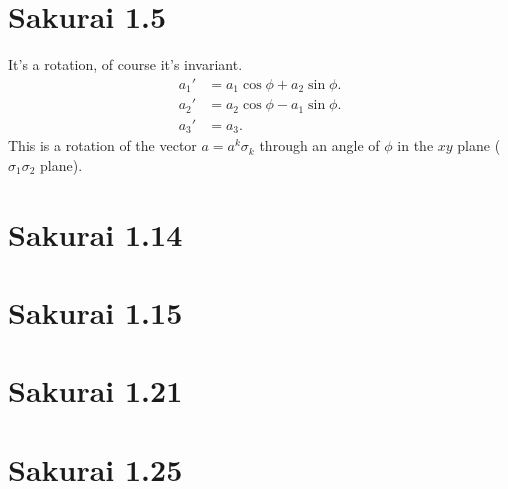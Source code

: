 \documentclass[
a4paper,
10pt,
twoside,
]{article}
\begin{document}
\titleinf
\maketitle
\startmcols

\section{Sakurai 1.5}
It's a rotation, of course it's invariant.
\begin{align}
	a_1' &= a_1\cos\phi + a_2\sin\phi.\\
	a_2' &= a_2\cos\phi - a_1\sin\phi.\\
	a_3' &= a_3.
\end{align}
This is a rotation of the vector $a = a^k\sigma_k$ through an angle of $\phi$ in the $xy$ plane ($\sigma_1\sigma_2$ plane).
\section{Sakurai 1.14}
\section{Sakurai 1.15}
\section{Sakurai 1.21}
\section{Sakurai 1.25}

\printbib


\stopmcols
\end{document}
